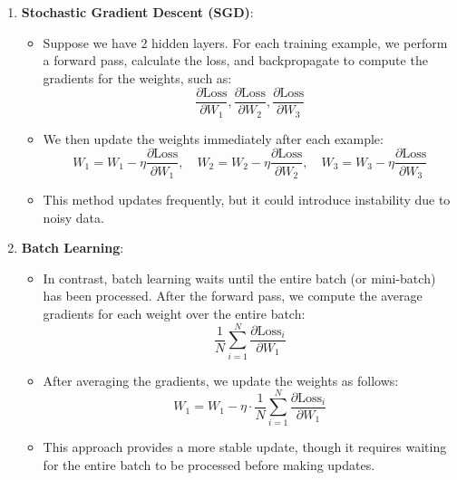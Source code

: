 \documentclass{letter}
\begin{document}
\begin{enumerate}
    \item \textbf{Stochastic Gradient Descent (SGD)}:
    \begin{itemize}
        \item Suppose we have 2 hidden layers. For each training example, we perform a forward pass, calculate the loss, and backpropagate to compute the gradients for the weights, such as:
        \[
        \frac{\partial \text{Loss}}{\partial W_1}, \frac{\partial \text{Loss}}{\partial W_2}, \frac{\partial \text{Loss}}{\partial W_3}
        \]
        \item We then update the weights immediately after each example:
        \[
        W_1 = W_1 - \eta \frac{\partial \text{Loss}}{\partial W_1}, \quad W_2 = W_2 - \eta \frac{\partial \text{Loss}}{\partial W_2}, \quad W_3 = W_3 - \eta \frac{\partial \text{Loss}}{\partial W_3}
        \]
        \item This method updates frequently, but it could introduce instability due to noisy data.
    \end{itemize}

    \item \textbf{Batch Learning}:
    \begin{itemize}
        \item In contrast, batch learning waits until the entire batch (or mini-batch) has been processed. After the forward pass, we compute the average gradients for each weight over the entire batch:
        \[
        \frac{1}{N} \sum_{i=1}^{N} \frac{\partial \text{Loss}_i}{\partial W_1}
        \]
        \item After averaging the gradients, we update the weights as follows:
        \[
        W_1 = W_1 - \eta \cdot \frac{1}{N} \sum_{i=1}^{N} \frac{\partial \text{Loss}_i}{\partial W_1}
        \]
        \item This approach provides a more stable update, though it requires waiting for the entire batch to be processed before making updates.
    \end{itemize}
\end{enumerate}
\end{document}
